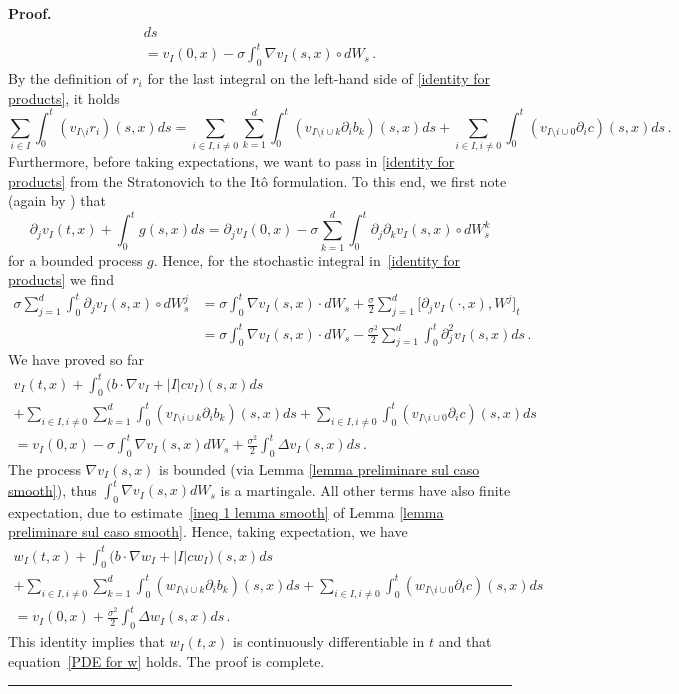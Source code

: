 \documentclass[a4paper,10pt]{article}
\newenvironment{proof}[1][Proof]{\noindent\textbf{#1.} }{\ \rule{0.5em}{0.5em}}
\begin{document}
\begin{proof}
\begin{multline}
ds\label{identity for products}\\
 =v_{I}(0,x)  -\sigma\int_{0}^{t}\nabla v_{I}(
s,x)  \circ dW_{s} \, .
\end{multline}
By the definition of $r_i$ for the last integral on the left-hand side of \eqref{identity for products}, it holds
\[
\sum_{i\in I}\int_{0}^{t}(v_{I\setminus i}r_{i})  (
s,x)  ds=\sum_{i\in I,i\neq0}\sum_{k=1}^{d}\int_{0}^{t}(
v_{I\setminus i\cup k}\partial_{i}b_{k})  (s,x)
ds+\sum_{i\in I,i\neq0}\int_{0}^{t}(v_{I\setminus i\cup0}\partial
_{i}c)  (s,x)  ds \,.
\]
Furthermore, before taking expectations, we want to pass in \eqref{identity for products} from the Stratonovich to the It\^o formulation. To this end, we first note
(again by \cite[Theorem 7.10]{KUNITA84}) that
\[
\partial_{j}v_{I}(t,x)  +\int_{0}^{t}g(s,x)
ds=\partial_{j}v_{I}(0,x)  -\sigma\sum_{k=1}^{d}\int_{0} 
^{t}\partial_{j}\partial_{k}v_{I}(s,x)  \circ dW_{s}^{k} 
\]
for a bounded process $g$. Hence, for the stochastic integral in~\eqref{identity for products} we find
\begin{align*}
\sigma\sum_{j=1}^{d}\int_{0}^{t}\partial_{j}v_{I}(s,x)  \circ
dW_{s}^{j}  &  =\sigma\int_{0}^{t}\nabla v_{I}(s,x)  \cdot
dW_{s}+\frac{\sigma}{2}\sum_{j=1}^{d}\big[  \partial_{j}v_{I}(
\cdot,x)  ,W^{j}\big]_{t}\\
&  =\sigma\int_{0}^{t}\nabla v_{I}(s,x)  \cdot dW_{s} 
-\frac{\sigma^{2}}{2}\sum_{j=1}^{d}\int_{0}^{t}\partial_{j}^{2}v_{I}(
s,x)  ds \,.
\end{align*}
We have proved so far
\begin{multline*}
v_{I}(t,x)  +\int_{0}^{t} \big(b\cdot\nabla v_{I}+\left\vert
I\right\vert cv_{I}\big)  (s,x)  ds\\
 +\sum_{i\in I,i\neq0}\sum_{k=1}^{d}\int_{0}^{t}(v_{I\setminus i\cup
k}\partial_{i}b_{k})  (s,x)  ds+ \sum_{i\in I,i\neq0} 
\int_{0}^{t}(v_{I\setminus i\cup0}\partial_{i}c)  (
s,x)  ds\\
 =v_{I}(0,x)  -\sigma\int_{0}^{t}\nabla v_{I}(
s,x)  dW_{s}+\frac{\sigma^{2}}{2}\int_{0}^{t}\Delta v_{I}(
s,x)  ds \,.
\end{multline*}
The process $\nabla v_{I}(s,x)$ is bounded (via Lemma
\ref{lemma preliminare sul caso smooth}), thus $\int_{0}^{t}\nabla
v_{I}(s,x)  dW_{s}$ is a martingale. All other terms have also
finite expectation, due to estimate~\eqref{ineq 1 lemma smooth} of Lemma
\ref{lemma preliminare sul caso smooth}. Hence, taking expectation, we have
\begin{multline*}
w_{I}(t,x)  +\int_{0}^{t}  \big(b\cdot\nabla w_{I}+\left\vert
I\right\vert cw_{I} \big)  (s,x)  ds\\
+\sum_{i\in I,i\neq0}\sum_{k=1}^{d}\int_{0}^{t}(w_{I\setminus i\cup
k}\partial_{i}b_{k})  (s,x)  ds+\sum_{i\in I,i\neq0} 
\int_{0}^{t}(w_{I\setminus i\cup0}\partial_{i}c)  (
s,x)  ds\\
=v_{I}(0,x)  +\frac{\sigma^{2}}{2}\int_{0}^{t}\Delta
w_{I}(s,x)  ds \,.
\end{multline*}
This identity implies that $w_{I}(t,x)$ is continuously
differentiable in $t$ and that equation~\eqref{PDE for w} holds. The proof is complete.
\end{proof}
\end{document}
